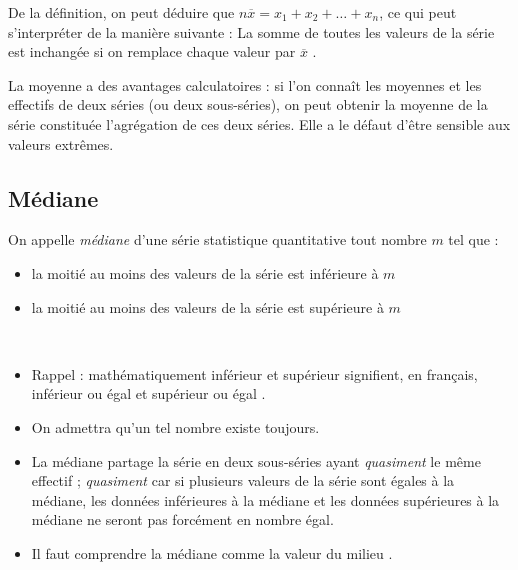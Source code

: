 \begin{rmq} De la d\'efinition, on peut d\'eduire que $n\overline{x}=x_1+x_2+\ldots+x_n$, ce qui peut s'interpr\'eter de la mani\`ere suivante : \og La somme de toutes les valeurs de la s\'erie est inchang\'ee si on remplace chaque valeur par $\overline{x}$ \fg. 
\end{rmq}

 La moyenne a des avantages calculatoires : si l'on conna\^it les moyennes et les effectifs de deux s\'eries (ou deux sous-s\'eries), on peut obtenir la moyenne de la s\'erie constitu\'ee l'agr\'egation de ces deux s\'eries. Elle a le d\'efaut d'\^etre sensible aux valeurs extr\^emes.

\subsection{M\'ediane}

\begin{definition*}
On appelle \emph{m\'ediane} d'une s\'erie statistique quantitative tout nombre $m$ tel que :
\begin{itemize}
	\item la moiti\'e au moins des valeurs de la s\'erie est inf\'erieure \`a $m$
	\item la moiti\'e au moins des valeurs de la s\'erie est sup\'erieure \`a $m$
\end{itemize}
\end{definition*}

\begin{rmqs}~
\begin{itemize}
	\item Rappel : math\'ematiquement \og inf\'erieur \fg{} et \og sup\'erieur \fg{} signifient, en fran\c{c}ais, \og inf\'erieur ou \'egal \fg{} et \og sup\'erieur ou \'egal \fg.
	\item On admettra qu'un tel nombre existe toujours.
	\item La m\'ediane partage la s\'erie en deux sous-s\'eries ayant \emph{quasiment} le m\^eme effectif ; \emph{quasiment} car si plusieurs valeurs de la s\'erie sont \'egales \`a la m\'ediane, les donn\'ees inf\'erieures \`a la m\'ediane et les donn\'ees sup\'erieures \`a la m\'ediane ne seront pas forc\'ement en nombre \'egal.
	\item Il faut comprendre la m\'ediane comme \og la valeur du milieu \fg.
\end{itemize}
\end{rmqs}

